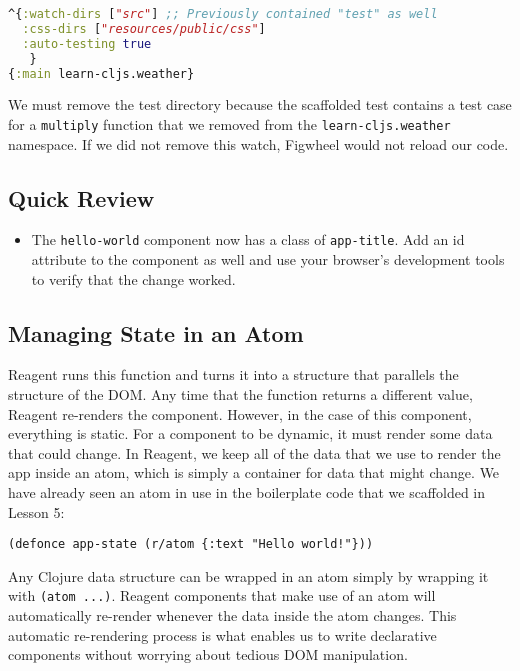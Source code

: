 \documentclass[10pt,twoside,openright]{memoir}
\begin{document}
\begin{lstlisting}[language=Clojure, caption={dev.cljs.edn}]
^{:watch-dirs ["src"] ;; Previously contained "test" as well
  :css-dirs ["resources/public/css"]
  :auto-testing true
   }
{:main learn-cljs.weather}
\end{lstlisting}

We must remove the test directory because the scaffolded test contains a
test case for a \texttt{multiply} function that we removed from the
\texttt{learn-cljs.weather} namespace. If we did not remove this watch,
Figwheel would not reload our code.

\subsection{Quick Review}

\begin{itemize}
\tightlist
\item
  The \texttt{hello-world} component now has a class of
  \texttt{app-title}. Add an id attribute to the component as well and
  use your browser's development tools to verify that the change worked.
\end{itemize}


\subsection{Managing State in an Atom}

Reagent runs this function and turns it into a structure that parallels
the structure of the DOM. Any time that the function returns a different
value, Reagent re-renders the component. However, in the case of this
component, everything is static. For a component to be dynamic, it must
render some data that could change. In Reagent, we keep all of the data
that we use to render the app inside an atom, which is simply a
container for data that might change. We have already seen an atom in
use in the boilerplate code that we scaffolded in Lesson 5:

\begin{verbatim}
(defonce app-state (r/atom {:text "Hello world!"}))
\end{verbatim}

Any Clojure data structure can be wrapped in an atom simply by wrapping
it with \texttt{(atom\ ...)}. Reagent components that make use of an
atom will automatically re-render whenever the data inside the atom
changes. This automatic re-rendering process is what enables us to write
declarative components without worrying about tedious DOM manipulation.
\end{document}

